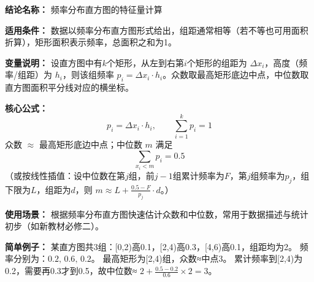 \textbf{结论名称：} 频率分布直方图的特征量计算

\textbf{适用条件：} 数据以频率分布直方图形式给出，组距通常相等（若不等也可用面积折算），矩形面积表示频率，总面积之和为1。

\textbf{变量说明：} 设直方图中有$k$个矩形，从左到右第$i$个矩形的组距为 $\Delta x_i$，高度（频率/组距）为 $h_i$，则该组频率 $p_i = \Delta x_i \cdot h_i$。众数取最高矩形底边中点，中位数取直方图面积平分线对应的横坐标。

\textbf{核心公式：}
\[
\boxed{p_i = \Delta x_i \cdot h_i,\qquad \sum_{i=1}^{k} p_i = 1}
\]
众数 $\approx$ 最高矩形底边中点；中位数 $m$ 满足
\[
\boxed{\sum_{x_i < m} p_i = 0.5}
\]
（或按线性插值：设中位数在第$j$组，前$j-1$组累计频率为$F$，第$j$组频率为$p_j$，组下限为$L$，组距为$d$，则 $m \approx L + \frac{0.5 - F}{p_j}\cdot d$。）

\textbf{使用场景：} 根据频率分布直方图快速估计众数和中位数，常用于数据描述与统计初步（如新教材必修二）。

\textbf{简单例子：} 某直方图共3组：[0,2)高0.1，[2,4)高0.3，[4,6)高0.1，组距均为2。
频率分别为：$0.2,\,0.6,\,0.2$。
最高矩形为[2,4)组，众数≈中点3。
累计频率到[2,4)为0.2，需要再0.3才到0.5，故中位数≈ $2 + \frac{0.5-0.2}{0.6}\times 2 = 3$。